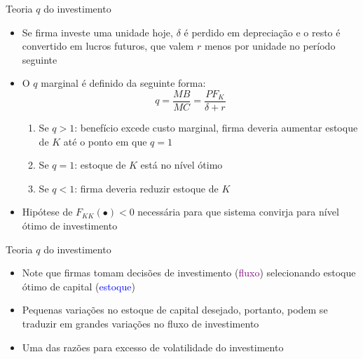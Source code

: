 \documentclass[10pt]{beamer}
\begin{document}
\begin{frame}
    {Teoria $q$ do investimento}
    \begin{itemize}
        \item Se firma investe uma unidade hoje, $\delta$ é perdido em depreciação e o resto é convertido em lucros futuros, que valem $r$ menos por unidade no período seguinte\bigskip
        \item O $q$ marginal é definido da seguinte forma:
        \begin{equation}
            q = \frac{MB}{MC} = \frac{PF_K}{\delta + r}\label{aula8_eq5}
        \end{equation}
        \begin{enumerate}
            \item Se $q > 1$: benefício excede custo marginal, firma deveria aumentar estoque de $K$ até o ponto em que $q = 1$\medskip
            \item Se $q = 1$: estoque de $K$ está no nível ótimo\medskip
            \item Se $q < 1$: firma deveria reduzir estoque de $K$\bigskip
        \end{enumerate}
        \item Hipótese de $F_{KK}(\bullet) < 0$ necessária para que sistema convirja para nível ótimo de investimento
    \end{itemize}
\end{frame}

\begin{frame}
    {Teoria $q$ do investimento}
    \begin{itemize}
        \item Note que firmas tomam decisões de investimento (\textcolor{purple}{fluxo}) selecionando estoque ótimo de capital (\textcolor{blue}{estoque})\bigskip
        \item Pequenas variações no estoque de capital desejado, portanto, podem se traduzir em grandes variações no fluxo de investimento\bigskip
        \item Uma das razões para excesso de volatilidade do investimento
    \end{itemize}
\end{frame}
\end{document}
